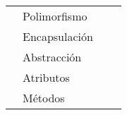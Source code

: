 \begin{table}[]
\begin{tabular}{|llll|}
                                                                               & Polimorfismo  &                                                                                                                                                                                                             &                                                                                                                                                                                                                                                                \\
                                                                               & Encapsulación &                                                                                                                                                                                                             &                                                                                                                                                                                                                                                                \\
                                                                               & Abstracción   &                                                                                                                                                                                                             &                                                                                                                                                                                                                                                                \\
                                                                               & Atributos     &                                                                                                                                                                                                             &                                                                                                                                                                                                                                                                \\
                                                                               & Métodos       &                                                                                                                                                                                                             &                                                                                                                                                                                                                                                                \\

\end{tabular}
\end{table}
